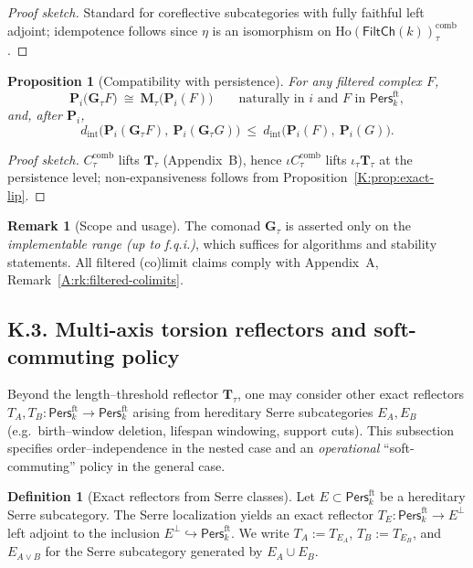 \documentclass[11pt]{article}
\DeclareRobustCommand{\hyp}{\nobreakdash-}
\newcommand{\Pers}{\mathsf{Pers}}
\newcommand{\Ho}{\mathrm{Ho}}
\numberwithin{equation}{section}
\newtheorem{proposition}[theorem]{Proposition}
\theoremstyle{definition}
\newtheorem{definition}[theorem]{Definition}
\newtheorem{remark}[theorem]{Remark}
\begin{document}
\begin{proof}[Proof sketch]
Standard for coreflective subcategories with fully faithful left adjoint; idempotence follows since \(\eta\) is an isomorphism on \(\Ho(\mathsf{FiltCh}(k))_\tau^{\mathrm{comb}}\).
\end{proof}

\begin{proposition}[Compatibility with persistence]\label{K:prop:compat}
For any filtered complex \(F\),
\[
\mathbf{P}_i\big(\mathbf{G}_\tau F\big)\ \cong\ \mathbf{M}_\tau\big(\mathbf{P}_i(F)\big)\qquad\text{naturally in \(i\) and \(F\) in }\Pers^{\mathrm{ft}}_k,
\]
and, after \(\mathbf{P}_i\),
\[
d_{\mathrm{int}}\!\big(\mathbf{P}_i(\mathbf{G}_\tau F),\ \mathbf{P}_i(\mathbf{G}_\tau G)\big)\ \le\ d_{\mathrm{int}}\!\big(\mathbf{P}_i(F),\ \mathbf{P}_i(G)\big).
\]
\end{proposition}

\begin{proof}[Proof sketch]
\(C_\tau^{\mathrm{comb}}\) lifts \(\mathbf{T}_\tau\) (Appendix~B), hence \(\iota C_\tau^{\mathrm{comb}}\) lifts \(\iota_\tau \mathbf{T}_\tau\) at the persistence level; non\hyp expansiveness follows from Proposition~\ref{K:prop:exact-lip}.
\end{proof}

\begin{remark}[Scope and usage]\label{K:rk:scope}
The comonad \(\mathbf{G}_\tau\) is asserted only on the \emph{implementable range (up to f.q.i.)}, which suffices for algorithms and stability statements. All filtered (co)limit claims comply with Appendix~A, Remark~\ref{A:rk:filtered-colimits}.
\end{remark}

\subsection*{K.3. Multi-axis torsion reflectors and soft-commuting policy}
Beyond the length–threshold reflector \( \mathbf{T}_\tau \), one may consider other exact reflectors \(T_A,T_B:\Pers^{\mathrm{ft}}_k\to\Pers^{\mathrm{ft}}_k\) arising from hereditary Serre subcategories \(E_A,E_B\) (e.g.\ birth–window deletion, lifespan windowing, support cuts). This subsection specifies order–independence in the nested case and an \emph{operational} ``soft\hyp commuting'' policy in the general case.

\begin{definition}[Exact reflectors from Serre classes]
Let \(E\subset \Pers^{\mathrm{ft}}_k\) be a hereditary Serre subcategory. The Serre localization yields an exact reflector \(T_E:\Pers^{\mathrm{ft}}_k\to E^\perp\) left adjoint to the inclusion \(E^\perp\hookrightarrow \Pers^{\mathrm{ft}}_k\). We write \(T_A:=T_{E_A}\), \(T_B:=T_{E_B}\), and \(E_{A\vee B}\) for the Serre subcategory generated by \(E_A\cup E_B\).
\end{definition}
\end{document}
